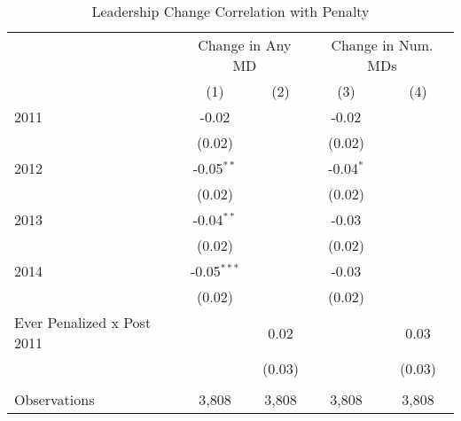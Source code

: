 \begin{table}[htbp]
   \caption{\label{tab:change_analysis} Leadership Change Correlation with Penalty}
   \bigskip
   \centering
   \begin{tabular}{lcccc}
      \toprule
       & \multicolumn{2}{c}{Change in Any MD} & \multicolumn{2}{c}{Change in Num. MDs}\\
                                 & (1)           & (2)    & (3)         & (4)\\  
      \midrule 
      2011                       & -0.02         &        & -0.02       &   \\   
                                 & (0.02)        &        & (0.02)      &   \\   
      2012                       & -0.05$^{**}$  &        & -0.04$^{*}$ &   \\   
                                 & (0.02)        &        & (0.02)      &   \\   
      2013                       & -0.04$^{**}$  &        & -0.03       &   \\   
                                 & (0.02)        &        & (0.02)      &   \\   
      2014                       & -0.05$^{***}$ &        & -0.03       &   \\   
                                 & (0.02)        &        & (0.02)      &   \\   
      Ever Penalized x Post 2011 &               & 0.02   &             & 0.03\\   
                                 &               & (0.03) &             & (0.03)\\   
       \\
      Observations               & 3,808         & 3,808  & 3,808       & 3,808\\  
      \bottomrule
   \end{tabular}
\end{table}
